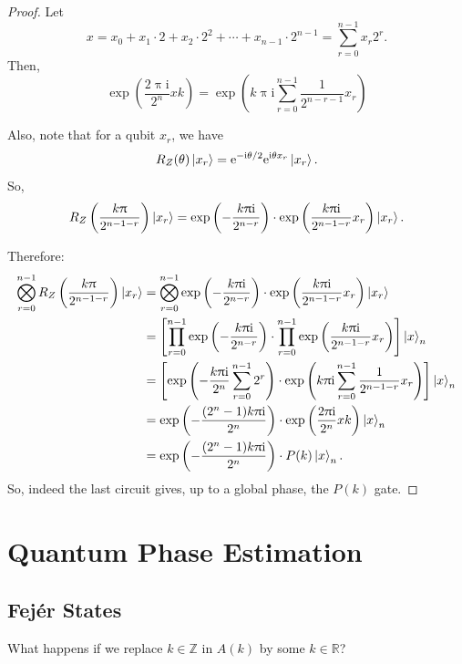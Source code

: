 \documentclass[12pt]{amsart}
\theoremstyle{plain}
\theoremstyle{definition}
\theoremstyle{remark}
\newcommand{\R}{\mathbb{R}}
\newcommand{\Z}{\mathbb{Z}}
\newcommand{\me}{\mathrm{e}}
\newcommand{\mi}{\mathrm{i}}
\newcommand{\mpi}{\uppi}
\begin{document}
\begin{proof}
  Let
  \[
    x = x_0 + x_1 \cdot 2 + x_2 \cdot 2^2 + \cdots + x_{n-1} \cdot 2^{n-1} = \sum_{r=0}^{n-1} x_r 2^r.
  \]
  Then,
  \begin{equation}\label{eq:exp1}
    \exp\left(\frac{2 \mpi \mi}{2^n} xk \right) = \exp\left(k \mpi \mi \sum_{r=0}^{n-1} \frac{1}{2^{n-r-1}} x_r\right)
  \end{equation}

  Also, note that for a qubit $x_r$, we have
  \[
    R_Z(\theta) \ket{x_r} = \me^{-\mi \theta/2} \me^{\mi \theta x_r} \ket{x_r}.
  \]
  So,
  \[
    R_Z\left(\frac{k \mpi}{2^{n-1-r}}\right) \ket{x_r} = \exp\left(-\frac{k \mpi \mi}{2^{n-r}}\right) \cdot \exp\left(\frac{k \mpi \mi}{2^{n-1-r}} x_r\right) \ket{x_r}.
  \]

  Therefore:
  \begin{align*}
    \bigotimes_{r=0}^{n-1}R_Z\left(\frac{k \mpi} {2^{n-1-r}}\right) \ket{x_r}
    &= \bigotimes_{r=0}^{n-1} \exp\left(-\frac{k \mpi \mi}{2^{n-r}}\right) \cdot \exp\left(\frac{k \mpi \mi}{2^{n-1-r}} x_r\right) \ket{x_r} \\
    &= \left[\prod_{r=0}^{n-1} \exp\left(-\frac{k \mpi \mi}{2^{n-r}}\right) \cdot \prod_{r=0}^{n-1}  \exp\left(\frac{k \mpi \mi}{2^{n-1-r}} x_r\right)\right] \ket{x}_n \\
    &= \left[\exp\left(-\frac{k \mpi \mi}{2^n} \sum_{r=0}^{n-1} 2^r\right) \cdot \exp\left(k \mpi \mi \sum_{r=0}^{n-1}\frac{1}{2^{n-1-r}} x_r\right)\right] \ket{x}_n \\
    &= \exp\left(-\frac{(2^n-1) k \mpi \mi}{2^n}\right) \cdot \exp\left(\frac{2 \mpi \mi}{2^n} xk \right) \ket{x}_n \\
    &= \exp\left(-\frac{(2^n-1) k \mpi \mi}{2^n}\right) \cdot P(k) \ket{x}_n.
  \end{align*}
  So, indeed the last circuit gives, up to a global phase, the $P(k)$ gate.
\end{proof}


\section{Quantum Phase Estimation}

\subsection{Fejér States}

What happens if we replace $k \in \Z$ in $A(k)$ by some $k \in  \R$?
\end{document}
